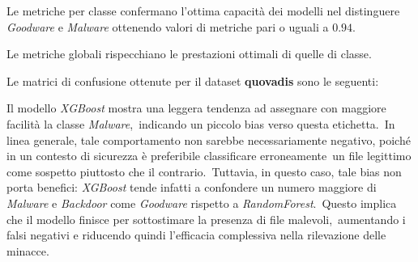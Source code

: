 \begin{figure}[]
    \centering
    \caption{}
    \label{fig:apimds-rf-rc}
\end{figure}

\begin{figure}[]
    \centering
    \caption{}
    \label{fig:apimds-rf-f1}
\end{figure}

\FloatBarrier


Le metriche per classe confermano l'ottima capacità dei modelli nel distinguere \textit{Goodware} e \textit{Malware} ottenendo valori
di metriche pari o uguali a $0.94$.

\begin{figure}[t]
    \centering
    \caption{}
    \label{fig:octack-mtrx-rf}
\end{figure}

\FloatBarrier

Le metriche globali rispecchiano le prestazioni ottimali di quelle di classe.


Le matrici di confusione ottenute per il dataset \textbf{quovadis} sono le seguenti:

\begin{figure}[t]
    \centering
    \caption{}
    \label{fig:octack-mtrx-rf}
\end{figure}

\FloatBarrier

Il modello \textit{XGBoost} mostra una leggera tendenza ad assegnare con maggiore facilità la classe \textit{Malware},\
indicando un piccolo bias verso questa etichetta.\
In linea generale, tale comportamento non sarebbe necessariamente negativo, poiché in un contesto di sicurezza è preferibile classificare erroneamente\
un file legittimo come sospetto piuttosto che il contrario.\
Tuttavia, in questo caso, tale bias non porta benefici: \textit{XGBoost} tende infatti a confondere un numero maggiore di \textit{Malware} e \textit{Backdoor} come \textit{Goodware} rispetto a \textit{RandomForest}.\
Questo implica che il modello finisce per sottostimare la presenza di file malevoli,\
aumentando i falsi negativi e riducendo quindi l'efficacia complessiva nella rilevazione delle minacce.

